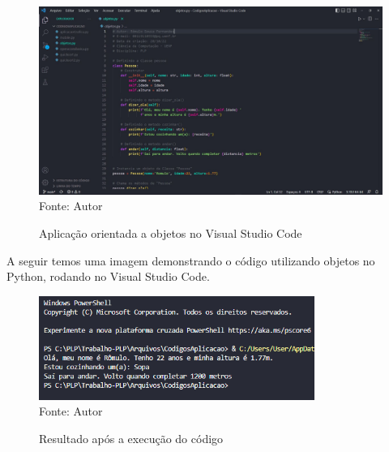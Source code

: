 	\begin{figure}[H]
		\begin{center}
			\caption{Aplicação orientada a objetos no Visual Studio Code} \label{ling1}
			\includegraphics[width=15cm]{objetoscode.JPG} \\
			{\tiny \sf Fonte:{ Autor}}
		\end{center}
	\end{figure}
	
	A seguir temos uma imagem demonstrando o código utilizando objetos no Python, rodando no Visual Studio Code.
    \begin{figure}[H]
    	\begin{center}
    		\caption{Resultado após a execução do código} \label{ling1}
    		\includegraphics[width=9cm]{objetos.png} \\
    		{\tiny \sf Fonte:{ Autor}}
    	\end{center}
    \end{figure}
    
    
